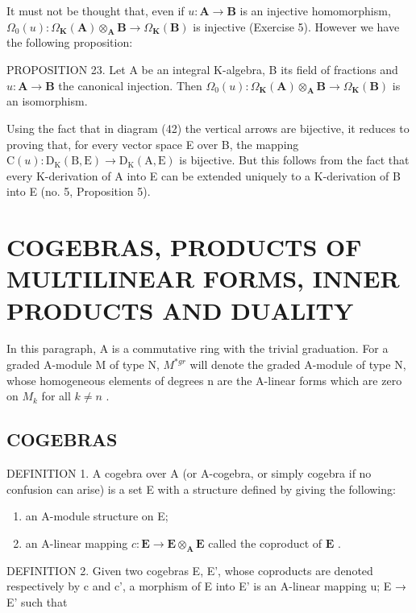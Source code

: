 It must not be thought that, even if \(u: \mathbf{A} \to \mathbf{B}\) is an injective homomorphism, \(\Omega_0(u): \Omega_{\mathbf{K}}(\mathbf{A}) \otimes_{\mathbf{A}} \mathbf{B} \to \Omega_{\mathbf{K}}(\mathbf{B})\) is injective (Exercise 5). However we have the following proposition:

PROPOSITION 23. Let A be an integral K-algebra, B its field of fractions and \(u: \mathbf{A} \to \mathbf{B}\) the canonical injection. Then \(\Omega_0(u): \Omega_{\mathbf{K}}(\mathbf{A}) \otimes_{\mathbf{A}} \mathbf{B} \to \Omega_{\mathbf{K}}(\mathbf{B})\) is an isomorphism.

Using the fact that in diagram (42) the vertical arrows are bijective, it reduces to proving that, for every vector space E over B, the mapping \(\mathrm{C}(u):\mathrm{D}_{\mathrm{K}}(\mathrm{B},\mathrm{E})\to\mathrm{D}_{\mathrm{K}}(\mathrm{A},\mathrm{E})\) is bijective. But this follows from the fact that every K-derivation of A into E can be extended uniquely to a K-derivation of B into E (no. 5, Proposition 5).

\section{COGEBRAS, PRODUCTS OF MULTILINEAR FORMS, INNER PRODUCTS AND DUALITY}

In this paragraph, A is a commutative ring with the trivial graduation. For a graded A-module M of type N, \(M^{*gr}\) will denote the graded A-module of type N, whose homogeneous elements of degrees n are the A-linear forms which are zero on \(M_{k}\) for all \(k \neq n\) .

\subsection{COGEBRAS}

DEFINITION 1. A cogebra over A (or A-cogebra, or simply cogebra if no confusion can arise) is a set E with a structure defined by giving the following:

\begin{enumerate}
\def\labelenumi{(\arabic{enumi})}
\item
  an A-module structure on E;
\item
  an A-linear mapping \(c: \mathbf{E} \to \mathbf{E} \otimes_{\mathbf{A}} \mathbf{E}\) called the coproduct of \(\mathbf{E}\) .
\end{enumerate}

DEFINITION 2. Given two cogebras E, E', whose coproducts are denoted respectively by c and c', a morphism of E into E' is an A-linear mapping u; E → E' such that

